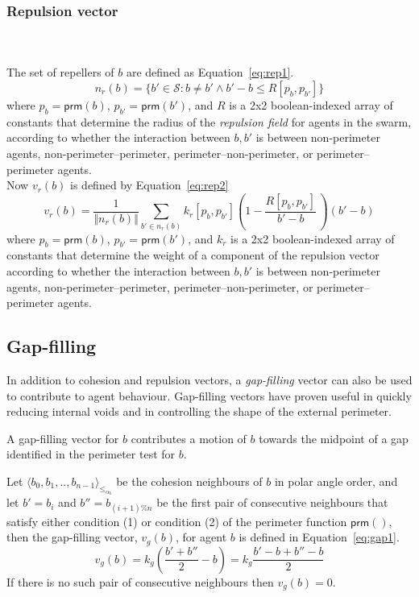 \documentclass[12pt,a4paper]{IEEEtran}
\newcommand{\magn}[1]{\Vert{#1}\Vert}
\newcommand{\vbb}[2]{#2-#1}
\newcommand{\pangle}{\mathit{\alpha}}
\newcommand{\leqaz}[3]{#2 \leq_{\pangle_#1} #3}
\newcommand{\angleordered}[2]{\langle #2 \rangle_{\leqaz{#1}{}{}}}
\newcommand{\prm}{\mathsf{prm}}
\newcommand{\kr}{\mathit{k_r}}
\newcommand{\kg}{\mathit{k_g}}
\newcommand{\rb}{\mathit{R}}
\begin{document}
\subsubsection{Repulsion vector}~\\
~\\
The set of repellers of $b$ are defined as Equation~\ref{eq:rep1}.
\small
\begin{equation}\label{eq:rep1}
	n_r(b) = \{b' \in \mathcal{S} : b \neq b' \wedge \vbb{b}{b'} \leq \rb[p_b,p_{b'}]\}
\end{equation}
\normalsize
where $p_b = \prm(b)$, $p_{b'} = \prm(b')$, and $\rb$ is a 2x2 boolean-indexed
array of constants that determine the radius of the \emph{repulsion field} for agents in the swarm, according to whether the interaction between $b,b'$ is between non-perimeter agents, non-perimeter--perimeter,
perimeter--non-perimeter, or perimeter--perimeter agents.\\

Now $v_r(b)$ is defined by Equation~\ref{eq:rep2}
\small
\begin{equation}\label{eq:rep2}
	v_r(b) = \frac{1}{\magn{n_r(b)}}\sum_{b' \in n_r(b)} \kr[p_b,p_{b'}] \left(1 - \frac{\rb[p_b,p_{b'}]}{\vbb{b}{b'}} \, \right) (\vbb{b}{b'})
\end{equation}
\normalsize
where $p_b = \prm(b)$, $p_{b'} = \prm(b')$, and $\kr$ is a 2x2 boolean-indexed
array of constants that determine the weight of a component of the repulsion
vector according to whether the interaction between $b,b'$ is between
non-perimeter agents, non-perimeter--perimeter, perimeter--non-perimeter, or
perimeter--perimeter agents.

\subsection{Gap-filling}

In addition to cohesion and repulsion vectors, a \emph{gap-filling} vector can
also be used to contribute to agent behaviour. Gap-filling vectors have proven
useful in quickly reducing internal voids and in controlling the shape of the
external perimeter.

A gap-filling vector for $b$ contributes a motion of $b$ towards the midpoint
of a gap identified in the perimeter test for $b$.

Let $\angleordered{b}{b_0, b_1, .., b_{n-1}}$ be the cohesion neighbours of $b$
in polar angle order, and let $b' = b_i$  and $b'' = b_{(i+1)\%n}$ be the first
pair of consecutive neighbours that satisfy either condition (1) or condition
(2) of the perimeter function $\prm()$, then the gap-filling vector, $v_g(b)$,
for agent $b$ is defined in Equation~\ref{eq:gap1}.
\small
\begin{equation}\label{eq:gap1}
v_g(b) = \kg \left (\frac{b' + b''}{2} - b \right) = \kg \frac{\vbb{b}{b'} + \vbb{b}{b''}}{2} 
\end{equation}
\normalsize
If there is no such pair of consecutive neighbours then $v_g(b) = 0$.
\end{document}
